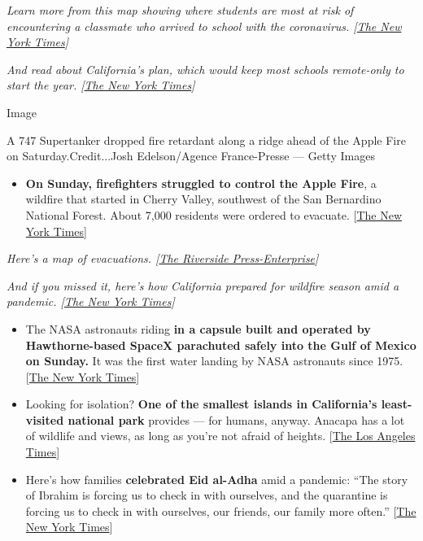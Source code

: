 \emph{Learn more from this map showing where students are most at risk
of encountering a classmate who arrived to school with the coronavirus.
{[}}\href{https://www.nytimes.com/interactive/2020/07/31/us/coronavirus-school-reopening-risk.html?}{\emph{The
New York Times}}\emph{{]}}

\emph{And read about California's plan, which would keep most schools
remote-only to start the year.
{[}}\href{https://www.nytimes.com/2020/07/17/us/california-schools-reopening-newsom.html}{\emph{The
New York Times}}\emph{{]}}

Image

A 747 Supertanker dropped fire retardant along a ridge ahead of the
Apple Fire on Saturday.Credit...Josh Edelson/Agence France-Presse ---
Getty Images

\begin{itemize}
\tightlist
\item
  \textbf{On Sunday, firefighters struggled to control the Apple Fire},
  a wildfire that started in Cherry Valley, southwest of the San
  Bernardino National Forest. About 7,000 residents were ordered to
  evacuate.
  {[}\href{https://www.nytimes.com/2020/08/02/us/apple-fire-ca.html?}{The
  New York Times}{]}
\end{itemize}

\emph{Here's a map of evacuations.
{[}}\href{https://www.pe.com/2020/08/01/this-map-shows-the-location-evacuations-for-the-apple-fire-in-cherry-valley/}{\emph{The
Riverside Press-Enterprise}}\emph{{]}}

\emph{And if you missed it, here's how California prepared for wildfire
season amid a pandemic.
{[}}\href{https://www.nytimes.com/2020/07/10/us/california-wildfires-coronavirus.html}{\emph{The
New York Times}}\emph{{]}}

\begin{itemize}
\item
  The NASA astronauts riding \textbf{in a capsule built and operated by
  Hawthorne-based SpaceX parachuted safely into the Gulf of Mexico on
  Sunday.} It was the first water landing by NASA astronauts since 1975.
  {[}\href{https://www.nytimes.com/2020/08/02/science/spacex-astronauts-splashdown.html}{The
  New York Times}{]}
\item
  Looking for isolation? \textbf{One of the smallest islands in
  California's least-visited national park} provides --- for humans,
  anyway. Anacapa has a lot of wildlife and views, as long as you're not
  afraid of heights.
  {[}\href{https://www.latimes.com/travel/story/2020-07-31/channel-island-birds-gulls-anacapa}{The
  Los Angeles Times}{]}
\item
  Here's how families \textbf{celebrated Eid al-Adha} amid a pandemic:
  ``The story of Ibrahim is forcing us to check in with ourselves, and
  the quarantine is forcing us to check in with ourselves, our friends,
  our family more often.''
  {[}\href{https://www.nytimes.com/2020/08/01/us/eid-al-adha-coronavirus.html}{The
  New York Times}{]}
\end{itemize}

